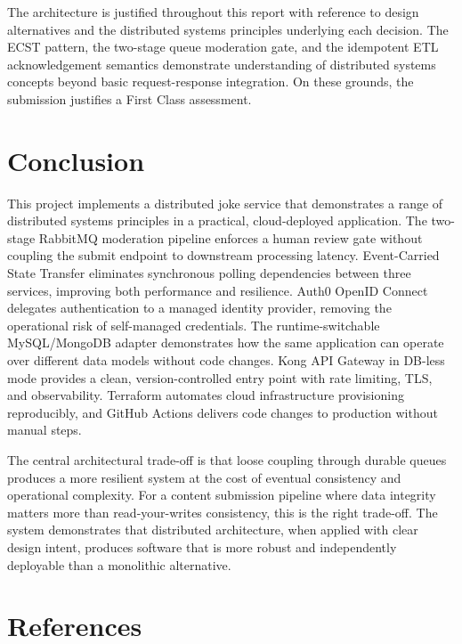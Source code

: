 \documentclass[12pt,a4paper]{article}
\begin{document}
The architecture is justified throughout this report with reference to design alternatives and the distributed systems principles underlying each decision. The ECST pattern, the two-stage queue moderation gate, and the idempotent ETL acknowledgement semantics demonstrate understanding of distributed systems concepts beyond basic request-response integration. On these grounds, the submission justifies a First Class assessment.

\section{Conclusion}

This project implements a distributed joke service that demonstrates a range of distributed systems principles in a practical, cloud-deployed application. The two-stage RabbitMQ moderation pipeline enforces a human review gate without coupling the submit endpoint to downstream processing latency. Event-Carried State Transfer eliminates synchronous polling dependencies between three services, improving both performance and resilience. Auth0 OpenID Connect delegates authentication to a managed identity provider, removing the operational risk of self-managed credentials. The runtime-switchable MySQL/MongoDB adapter demonstrates how the same application can operate over different data models without code changes. Kong API Gateway in DB-less mode provides a clean, version-controlled entry point with rate limiting, TLS, and observability. Terraform automates cloud infrastructure provisioning reproducibly, and GitHub Actions delivers code changes to production without manual steps.

The central architectural trade-off is that loose coupling through durable queues produces a more resilient system at the cost of eventual consistency and operational complexity. For a content submission pipeline where data integrity matters more than read-your-writes consistency, this is the right trade-off. The system demonstrates that distributed architecture, when applied with clear design intent, produces software that is more robust and independently deployable than a monolithic alternative.

\newpage
\section*{References}
\end{document}
